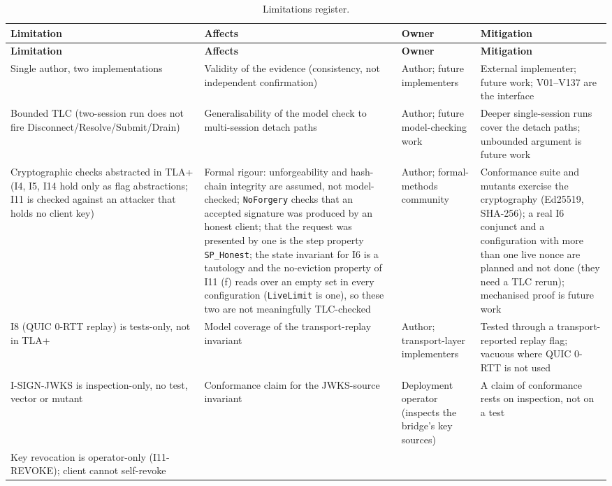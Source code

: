 \footnotesize
\begin{longtable}{p{} p{} p{} p{}}
\caption{Limitations register.}
\label{tab:limitations}\\
\toprule
\textbf{Limitation} & \textbf{Affects} & \textbf{Owner} & \textbf{Mitigation} \\
\midrule
\endfirsthead
\toprule
\textbf{Limitation} & \textbf{Affects} & \textbf{Owner} & \textbf{Mitigation} \\
\midrule
\endhead
Single author, two implementations &
Validity of the evidence (consistency, not independent confirmation) &
Author; future implementers &
External implementer; future work; V01--V137 are the interface \\
Bounded TLC (two-session run does not fire Disconnect/Resolve/Submit/Drain) &
Generalisability of the model check to multi-session detach paths &
Author; future model-checking work &
Deeper single-session runs cover the detach paths; unbounded argument is future work \\
Cryptographic checks abstracted in TLA+ (I4, I5, I14 hold only as flag abstractions; I11 is checked against an attacker that holds no client key) &
Formal rigour: unforgeability and hash-chain integrity are assumed, not model-checked; \texttt{NoForgery} checks that an accepted signature was produced by an honest client; that the request was presented by one is the step property \texttt{SP\_Honest}; the state invariant for I6 is a tautology and the no-eviction property of I11 (f) reads over an empty set in every configuration (\texttt{LiveLimit} is one), so these two are not meaningfully TLC-checked &
Author; formal-methods community &
Conformance suite and mutants exercise the cryptography (Ed25519, SHA-256); a real I6 conjunct and a configuration with more than one live nonce are planned and not done (they need a TLC rerun); mechanised proof is future work \\
I8 (QUIC 0-RTT replay) is tests-only, not in TLA+ &
Model coverage of the transport-replay invariant &
Author; transport-layer implementers &
Tested through a transport-reported replay flag; vacuous where QUIC 0-RTT is not used \\
I-SIGN-JWKS is inspection-only, no test, vector or mutant &
Conformance claim for the JWKS-source invariant &
Deployment operator (inspects the bridge's key sources) &
A claim of conformance rests on inspection, not on a test \\
Key revocation is operator-only (I11-REVOKE); client cannot self-revoke &

\end{longtable}
